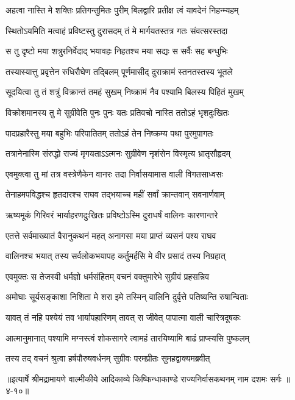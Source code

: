 \twolineshloka
{अहत्वा नास्ति मे शक्तिः प्रतिगन्तुमितः पुरीम्}
{बिलद्वारि प्रतीक्ष त्वं यावदेनं निहन्म्यहम्} %

\twolineshloka
{स्थितोऽयमिति मत्वाहं प्रविष्टस्तु दुरासदम्}
{तं मे मार्गयतस्तत्र गतः संवत्सरस्तदा} %

\twolineshloka
{स तु दृष्टो मया शत्रुरनिर्वेदाद् भयावहः}
{निहतश्च मया सद्यः स सर्वैः सह बन्धुभिः} %

\twolineshloka
{तस्यास्यात्तु प्रवृत्तेन रुधिरौघेण तद्बिलम्}
{पूर्णमासीद् दुराक्रामं स्तनतस्तस्य भूतले} %

\twolineshloka
{सूदयित्वा तु तं शत्रुं विक्रान्तं तमहं सुखम्}
{निष्क्रामं नैव पश्यामि बिलस्य पिहितं मुखम्} %

\twolineshloka
{विक्रोशमानस्य तु मे सुग्रीवेति पुनः पुनः}
{यतः प्रतिवचो नास्ति ततोऽहं भृशदुःखितः} %

\twolineshloka
{पादप्रहारैस्तु मया बहुभिः परिपातितम्}
{ततोऽहं तेन निष्क्रम्य पथा पुरमुपागतः} %

\twolineshloka
{तत्रानेनास्मि संरुद्धो राज्यं मृगयताऽऽत्मनः}
{सुग्रीवेण नृशंसेन विस्मृत्य भ्रातृसौहृदम्} %

\twolineshloka
{एवमुक्त्वा तु मां तत्र वस्त्रेणैकेन वानरः}
{तदा निर्वासयामास वाली विगतसाध्वसः} %

\twolineshloka
{तेनाहमपविद्धश्च हृतदारश्च राघव}
{तद्भयाच्च महीं सर्वां क्रान्तवान् सवनार्णवाम्} %

\twolineshloka
{ऋष्यमूकं गिरिवरं भार्याहरणदुःखितः}
{प्रविष्टोऽस्मि दुराधर्षं वालिनः कारणान्तरे} %

\twolineshloka
{एतत्ते सर्वमाख्यातं वैरानुकथनं महत्}
{अनागसा मया प्राप्तं व्यसनं पश्य राघव} %

\twolineshloka
{वालिनश्च भयात् तस्य सर्वलोकभयापह}
{कर्तुमर्हसि मे वीर प्रसादं तस्य निग्रहात्} %

\twolineshloka
{एवमुक्तः स तेजस्वी धर्मज्ञो धर्मसंहितम्}
{वचनं वक्तुमारेभे सुग्रीवं प्रहसन्निव} %

\twolineshloka
{अमोघाः सूर्यसङ्काशा निशिता मे शरा इमे}
{तस्मिन् वालिनि दुर्वृत्ते पतिष्यन्ति रुषान्विताः} %

\twolineshloka
{यावत् तं नहि पश्येयं तव भार्यापहारिणम्}
{तावत् स जीवेत् पापात्मा वाली चारित्रदूषकः} %

\twolineshloka
{आत्मानुमानात् पश्यामि मग्नस्त्वं शोकसागरे}
{त्वामहं तारयिष्यामि बाढं प्राप्स्यसि पुष्कलम्} %

\twolineshloka
{तस्य तद् वचनं श्रुत्वा हर्षपौरुषवर्धनम्}
{सुग्रीवः परमप्रीतः सुमहद्वाक्यमब्रवीत्} %


॥इत्यार्षे श्रीमद्रामायणे वाल्मीकीये आदिकाव्ये किष्किन्धाकाण्डे राज्यनिर्वासकथनम् नाम दशमः सर्गः ॥४-१०॥
